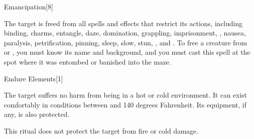 \begin{spellsection}{Emancipation}[8]
    \begin{spellheader}
    \end{spellheader}
    \begin{spellcontent}
        \begin{spelltargetinginfo}
        \end{spelltargetinginfo}
        \begin{spelleffects}

            \spelleffect The target is freed from all spells and effects that restrict its actions, including binding, charms, entangle, daze, domination, grappling, imprisonment, , nausea, paralysis, petrification, pinning, sleep, slow, stun, , and . To free a creature from  or , you must know its name and background, and you must cast this spell at the spot where it was entombed or banished into the maze.
        \end{spelleffects}
    \end{spellcontent}
    \begin{spellfooter}
    \end{spellfooter}
\end{spellsection}

\begin{spellsection}{Endure Elements}[1]
    \begin{spellheader}
    \end{spellheader}
    \begin{spellcontent}
        \begin{spelltargetinginfo}
        \end{spelltargetinginfo}
        \begin{spelleffects}

            \spelleffect The target suffers no harm from being in a hot or cold environment. It can exist comfortably in conditions between  and 140 degrees Fahrenheit. Its equipment, if any, is also protected.
            \spelldur \durext
        \end{spelleffects}
    \end{spellcontent}
    \begin{spellfooter}
        \spellnotes This ritual does not protect the target from fire or cold damage.
    \end{spellfooter}
\end{spellsection}


